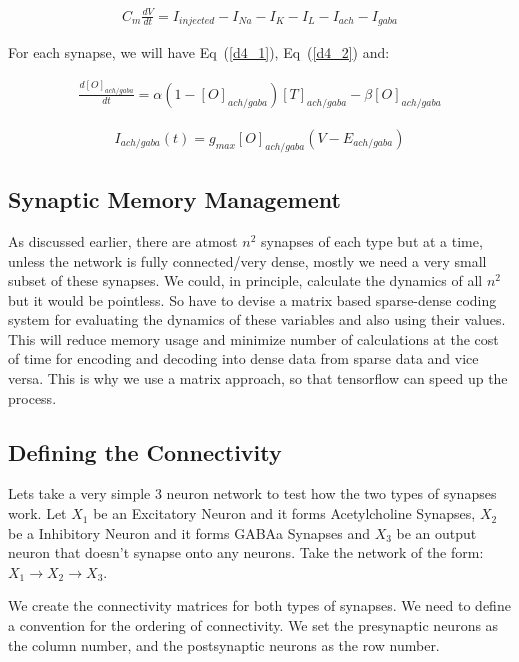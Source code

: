 \documentclass[10pt,letterpaper]{article}
\begin{document}
\begin{eqnarray}C_m\frac{dV}{dt} = I_{injected} - I_{Na} - I_K - I_L - I_{ach} - I_{gaba}\end{eqnarray}

For each synapse, we will have Eq~(\ref{d4_1}), Eq~(\ref{d4_2}) and:

\begin{eqnarray}\frac{d[O]_{ach/gaba}}{dt} = \alpha (1-[O]_{ach/gaba})[T]_{ach/gaba}-\beta[O]_{ach/gaba}\end{eqnarray}

\begin{eqnarray}I_{ach/gaba}(t)=g_{max}[O]_{ach/gaba}(V−E_{ach/gaba})\end{eqnarray}

\subsection*{Synaptic Memory Management}

As discussed earlier, there are atmost $n^2$ synapses of each type but at a time, unless the network is fully connected/very dense, mostly we need a very small subset of these synapses. We could, in principle, calculate the dynamics of all $n^2$ but it would be pointless. So have to devise a matrix based sparse-dense coding system for evaluating the dynamics of these variables and also using their values. This will reduce memory usage and minimize number of calculations at the cost of time for encoding and decoding into dense data from sparse data and vice versa. This is why we use a matrix approach, so that tensorflow can speed up the process. 

\subsection*{Defining the Connectivity}

Lets take a very simple 3 neuron network to test how the two types of synapses work. Let $X_1$ be an Excitatory Neuron and it forms Acetylcholine Synapses, $X_2$ be a Inhibitory Neuron and it forms GABAa Synapses and $X_3$ be an output neuron that doesn't synapse onto any neurons. Take the network of the form: $X_1\rightarrow X_2\rightarrow X_3$. 

We create the connectivity matrices for both types of synapses. We need to define a convention for the ordering of connectivity. We set the presynaptic neurons as the column number, and the postsynaptic neurons as the row number.  
\end{document}
